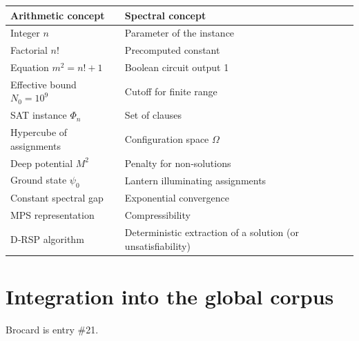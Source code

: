 \documentclass[11pt,a4paper]{article}
\begin{document}
\begin{center}
\small
\begin{tabular}{@{}l|l@{}}
\toprule
\textbf{Arithmetic concept} & \textbf{Spectral concept} \\
\midrule
Integer $n$ & Parameter of the instance \\
Factorial $n!$ & Precomputed constant \\
Equation $m^2 = n!+1$ & Boolean circuit output 1 \\
Effective bound $N_0 = 10^9$ & Cutoff for finite range \\
SAT instance $\Phi_n$ & Set of clauses \\
Hypercube of assignments & Configuration space $\Omega$ \\
Deep potential $M^2$ & Penalty for non‑solutions \\
Ground state $\psi_0$ & Lantern illuminating assignments \\
Constant spectral gap & Exponential convergence \\
MPS representation & Compressibility \\
D‑RSP algorithm & Deterministic extraction of a solution (or unsatisfiability) \\
\bottomrule
\end{tabular}
\end{center}

\section{Integration into the global corpus}

Brocard is entry \#21.
\end{document}
